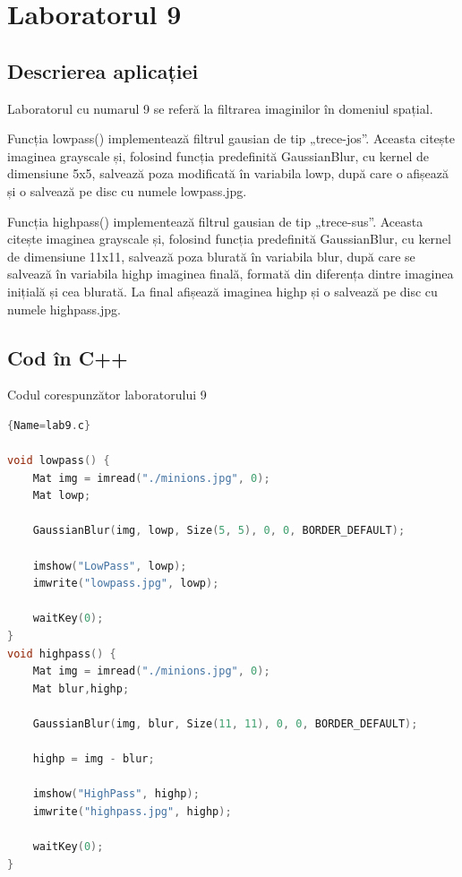 \documentclass{amsart}
\begin{document}
\newpage

\section{Laboratorul 9}

\subsection{Descrierea aplicației}
\par
Laboratorul cu numarul 9 se referă la filtrarea imaginilor în domeniul spațial.
\\ \par
Funcția lowpass() implementează filtrul gausian de tip „trece-jos”. Aceasta citește imaginea grayscale și, folosind funcția predefinită GaussianBlur, cu kernel de dimensiune 5x5, salvează poza modificată în variabila lowp, după care o afișează și o salvează pe disc cu numele lowpass.jpg.
\\ \par
Funcția highpass() implementează filtrul gausian de tip „trece-sus”. Aceasta citește imaginea grayscale și, folosind funcția predefinită GaussianBlur, cu kernel de dimensiune 11x11, salvează poza blurată în variabila blur, după care se salvează în variabila highp imaginea finală, formată din diferența dintre imaginea inițială și cea blurată. La final afișează imaginea highp și o salvează pe disc cu numele highpass.jpg.

\subsection{Cod \^{i}n C++}

Codul corespunzător laboratorului 9

\begin{lstlisting}[language=C++]{Name=lab9.c}

void lowpass() {
	Mat img = imread("./minions.jpg", 0);
	Mat lowp;

	GaussianBlur(img, lowp, Size(5, 5), 0, 0, BORDER_DEFAULT);

	imshow("LowPass", lowp);
	imwrite("lowpass.jpg", lowp);

	waitKey(0);
}
void highpass() {
	Mat img = imread("./minions.jpg", 0);
	Mat blur,highp;

	GaussianBlur(img, blur, Size(11, 11), 0, 0, BORDER_DEFAULT);

	highp = img - blur;

	imshow("HighPass", highp);
	imwrite("highpass.jpg", highp);

	waitKey(0);
}

 \end{lstlisting}
\end{document}
